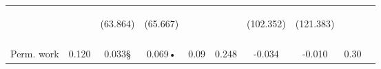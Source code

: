 \begin{table}[h!]
{\begin{tabular}{lccccccccc}
 & \begin{footnotesize}\end{footnotesize} & \begin{footnotesize}(63.864)\end{footnotesize} & \begin{footnotesize}(65.667)\end{footnotesize} & \begin{footnotesize}\end{footnotesize} & \begin{footnotesize}\end{footnotesize} & \begin{footnotesize}(102.352)\end{footnotesize} & \begin{footnotesize}(121.383)\end{footnotesize} & \begin{footnotesize}\end{footnotesize} & \begin{footnotesize}\end{footnotesize}\\
 & \begin{footnotesize}\end{footnotesize} & \begin{footnotesize}[0.437]\end{footnotesize} & \begin{footnotesize}[1.000]\end{footnotesize} & \begin{footnotesize}\end{footnotesize} & \begin{footnotesize}\end{footnotesize} & \begin{footnotesize}[0.753]\end{footnotesize} & \begin{footnotesize}[0.096]\end{footnotesize} & \begin{footnotesize}\end{footnotesize} & \begin{footnotesize}\end{footnotesize}\\
\noalign{\smallskip}Perm. work & 0.120 & 0.033§ & 0.069• & 0.09 & 0.248 & -0.034 & -0.010 & 0.30 & \\

\end{tabular}}
\end{table}
